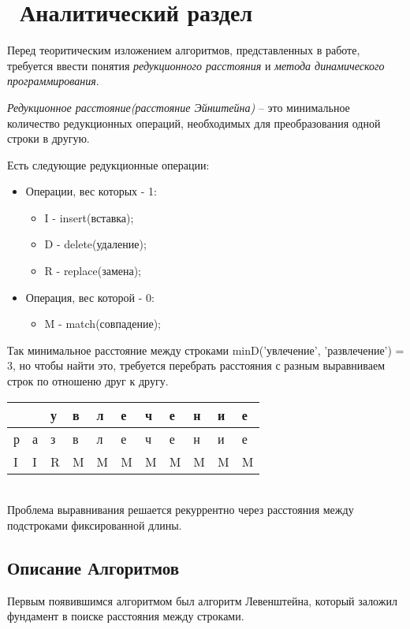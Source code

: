 \chapter{ Аналитический раздел}
\label{cha:analysis}

Перед теоритическим изложением алгоритмов, представленных в работе, требуется ввести понятия \textit{редукционного расстояния} и \textit{метода динамического программирования}. 

\textit{Редукционное расстояние(расстояние Эйнштейна)} -- это минимальное количество  редукционных операций, необходимых для преобразования одной строки в другую. 

Есть следующие редукционные операции:
\begin{itemize}
\item Операции, вес которых - 1:
\begin{itemize}
 \item I - insert(вставка);
 \item D - delete(удаление);
 \item R - replace(замена);
\end{itemize}
\item Операция, вес которой - 0:
\begin{itemize}
 \item M - match(совпадение);
\end{itemize}
\end{itemize}

Так минимальное расстояние между строками minD('увлечение', 'развлечение') = 3, но чтобы найти это, требуется перебрать расстояния с разным выравниваем строк по отношеню друг к другу.\\

\begin{tabu} to 0.8\textwidth { | X[c] | X[c] | X[c] | X[c] | X[c] | X[c] | X[c] | X[c] | X[c] | X[c] | X[c] | }
 \hline
    &  & у & в & л & е & ч & е & н & и & е \\
 \hline
    р & а & з & в & л & е & ч & е & н & и & е  \\
 \hline
    I & I & R & M & M & M & M & M & M & M & M  \\
\hline
\end{tabu}\\

Проблема выравнивания решается рекуррентно через расстояния между подстроками фиксированной длины.

\section{ Описание Алгоритмов}
Первым появившимся алгоритмом был алгоритм Левенштейна, который заложил фундамент в поиске расстояния между строками.

